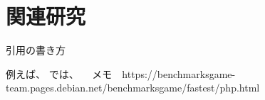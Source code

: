 \chapter{関連研究}
\label{cha:related}
引用の書き方

例えば、\cite{NS2} では、~~
メモ　https://benchmarksgame-team.pages.debian.net/benchmarksgame/fastest/php.html

